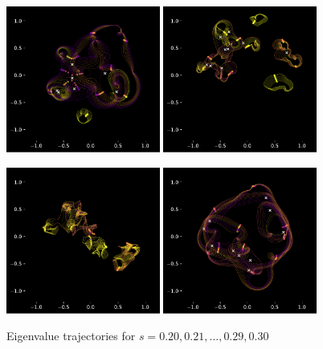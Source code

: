 \documentclass{article}
\begin{document}
	\newpage

	\begin{figure}[htbp]
		\centering
		\includegraphics[width=0.45\textwidth]{figures/N10Circle02to03.pdf}
		\includegraphics[width=0.45\textwidth]{figures/N10Meander02to03.pdf}

		\includegraphics[width=0.45\textwidth]{figures/N10Crossing02to03.pdf}
		\includegraphics[width=0.45\textwidth]{figures/N10Circle02to03B.pdf}
		\caption{Eigenvalue trajectories for $s= 0.20, 0.21, \dots , 0.29, 0.30$ }
		\label{fig:pdf_image}
	\end{figure}
\end{document}
